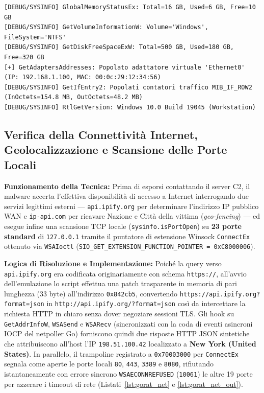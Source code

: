\documentclass[11pt, a4paper]{article}
\begin{document}
\noindent\begin{minipage}{\linewidth}
\begin{lstlisting}[style=consoleout, caption={Profilo hardware, disco, rete e sistema operativo acquisito dal RAT in Go generico.}, label={lst:gorat_hw_out}]
[DEBUG/SYSINFO] GlobalMemoryStatusEx: Total=16 GB, Used=6 GB, Free=10 GB
[DEBUG/SYSINFO] GetVolumeInformationW: Volume='Windows', FileSystem='NTFS'
[DEBUG/SYSINFO] GetDiskFreeSpaceExW: Total=500 GB, Used=180 GB, Free=320 GB
[+] GetAdaptersAddresses: Popolato adattatore virtuale 'Ethernet0' (IP: 192.168.1.100, MAC: 00:0c:29:12:34:56)
[DEBUG/SYSINFO] GetIfEntry2: Popolati contatori traffico MIB_IF_ROW2 (InOctets=154.8 MB, OutOctets=48.2 MB)
[DEBUG/SYSINFO] RtlGetVersion: Windows 10.0 Build 19045 (Workstation)
\end{lstlisting}
\end{minipage}


\subsection{Verifica della Connettivit\`a Internet, Geolocalizzazione e Scansione delle Porte Locali}

\textbf{Funzionamento della Tecnica:} Prima di esporsi contattando il server C2, il malware accerta l'effettiva disponibilit\`a di accesso a Internet interrogando due servizi legittimi esterni --- \texttt{api.\allowbreak{}ipify.\allowbreak{}org} per determinare l'indirizzo IP pubblico WAN e \texttt{ip-api.com} per ricavare Nazione e Citt\`a della vittima (\textit{geo-fencing}) --- ed esegue infine una scansione TCP locale (\texttt{sysinfo.\allowbreak{}is\allowbreak{}Port\allowbreak{}Open}) su \textbf{23 porte standard} di \texttt{127.0.0.1} tramite il puntatore di estensione Winsock \texttt{ConnectEx} ottenuto via \texttt{WSAIoctl} (\texttt{SIO\_\allowbreak{}GET\_\allowbreak{}EXTENSION\_\allowbreak{}FUNCTION\_\allowbreak{}POINTER = 0xC8000006}).

\textbf{Logica di Risoluzione e Implementazione:} Poich\'e la query verso \texttt{api.\allowbreak{}ipify.\allowbreak{}org} era codificata originariamente con schema \texttt{https://}, all'avvio dell'emulazione lo script effettua una patch trasparente in memoria di pari lunghezza (33 byte) all'indirizzo \texttt{0x842cb5}, convertendo \texttt{https://\allowbreak{}api.\allowbreak{}ipify.\allowbreak{}org?format=json} in \texttt{http://\allowbreak{}api.\allowbreak{}ipify.\allowbreak{}org/\allowbreak{}?format=json} cos\`i da intercettare la richiesta HTTP in chiaro senza dover negoziare sessioni TLS. Gli hook su \texttt{GetAddrInfoW}, \texttt{WSASend} e \texttt{WSARecv} (sincronizzati con la coda di eventi asincroni IOCP del netpoller Go) forniscono quindi due risposte HTTP JSON sintetiche che attribuiscono all'host l'IP \texttt{198.51.100.42} localizzato a \textbf{New York (United States)}. In parallelo, il trampoline registrato a \texttt{0x70003000} per \texttt{ConnectEx} segnala come aperte le porte locali \texttt{80}, \texttt{443}, \texttt{3389} e \texttt{8080}, rifiutando istantaneamente con errore sincrono \texttt{WSAECONNREFUSED} (\texttt{10061}) le altre 19 porte per azzerare i timeout di rete (Listati~\ref{lst:gorat_net} e \ref{lst:gorat_net_out}).
\end{document}
